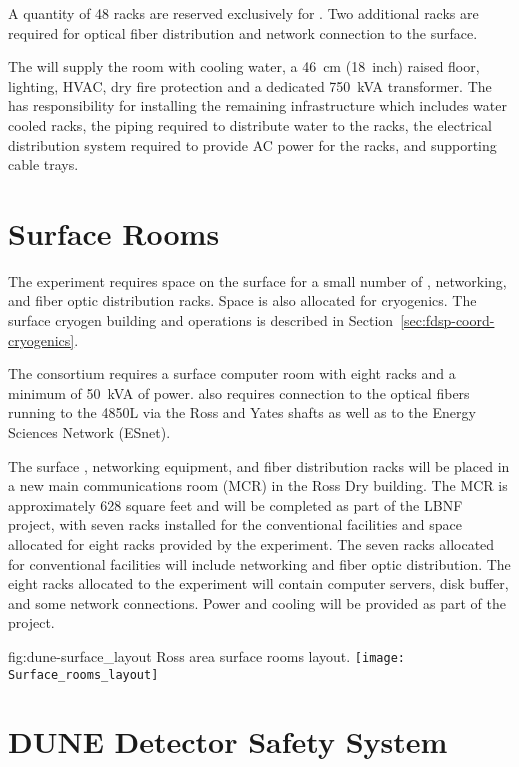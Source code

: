 A quantity of 48 racks are reserved exclusively for .  Two
additional racks are required for optical fiber distribution and
network connection to the surface.

The  will supply the  room with cooling
water, a \SI{46}{cm} (18~inch) raised floor, lighting, HVAC, dry fire protection
and a dedicated 750~kVA transformer.  
The  has responsibility for installing the remaining infrastructure which includes water cooled racks, the piping required to distribute water to the racks,  the electrical distribution system required to provide AC power for the racks, and supporting cable trays.


\section{Surface Rooms}
\label{sec:fdsp-coord-surf-rooms}

The  experiment requires space on the surface for a small
number of , networking, and fiber optic distribution racks.  Space
is also allocated for cryogenics.  The surface cryogen building and
operations is described in 
Section~\ref{sec:fdsp-coord-cryogenics}.

The  consortium requires a surface computer room with eight
racks and a minimum of 50~kVA of power.   also requires connection
to the optical fibers running to the 4850L via the Ross and Yates
shafts as well as to the Energy Sciences Network (ESnet).

The surface , networking equipment, and fiber distribution racks
will be placed in a new main communications room (MCR) in the Ross Dry
building.  The MCR is approximately 628 square feet and will be
completed as part of the LBNF project, with seven racks installed for
the conventional facilities and space allocated for eight racks
provided by the experiment.  The seven racks allocated for
conventional facilities will include networking and fiber optic
distribution.  The eight racks allocated to the experiment will
contain computer servers, disk buffer, and some network connections.
Power and cooling will be provided as part of the  project.
\begin{dunefigure}{fig:dune-surface_layout}
  {Ross area surface rooms layout.}
  \texttt{[image: Surface\_rooms\_layout]}
\end{dunefigure}

\section{DUNE Detector Safety System}
\label{sec:fdsp-coord-det-safety}


